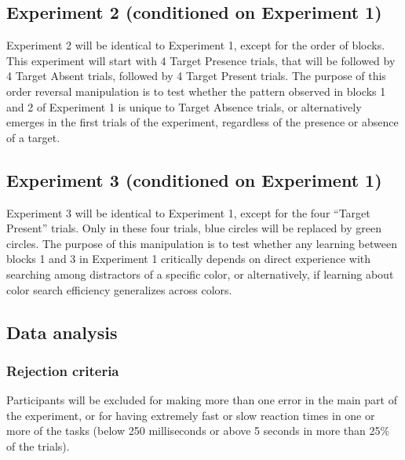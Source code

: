 \documentclass[
  english,
  man]{apa6}
\begin{document}
\hypertarget{experiment-2-conditioned-on-experiment-1}{%
\subsection{Experiment 2 (conditioned on Experiment 1)}\label{experiment-2-conditioned-on-experiment-1}}

Experiment 2 will be identical to Experiment 1, except for the order of blocks. This experiment will start with 4 Target Presence trials, that will be followed by 4 Target Absent trials, followed by 4 Target Present trials. The purpose of this order reversal manipulation is to test whether the pattern observed in blocks 1 and 2 of Experiment 1 is unique to Target Absence trials, or alternatively emerges in the first trials of the experiment, regardless of the presence or absence of a target.

\hypertarget{experiment-3-conditioned-on-experiment-1}{%
\subsection{Experiment 3 (conditioned on Experiment 1)}\label{experiment-3-conditioned-on-experiment-1}}

Experiment 3 will be identical to Experiment 1, except for the four \enquote{Target Present} trials. Only in these four trials, blue circles will be replaced by green circles. The purpose of this manipulation is to test whether any learning between blocks 1 and 3 in Experiment 1 critically depends on direct experience with searching among distractors of a specific color, or alternatively, if learning about color search efficiency generalizes across colors.

\hypertarget{data-analysis}{%
\subsection{Data analysis}\label{data-analysis}}

\hypertarget{rejection-criteria}{%
\subsubsection{Rejection criteria}\label{rejection-criteria}}

Participants will be excluded for making more than one error in the main part of the experiment, or for having extremely fast or slow reaction times in one or more of the tasks (below 250 milliseconds or above 5 seconds in more than 25\% of the trials).
\end{document}
